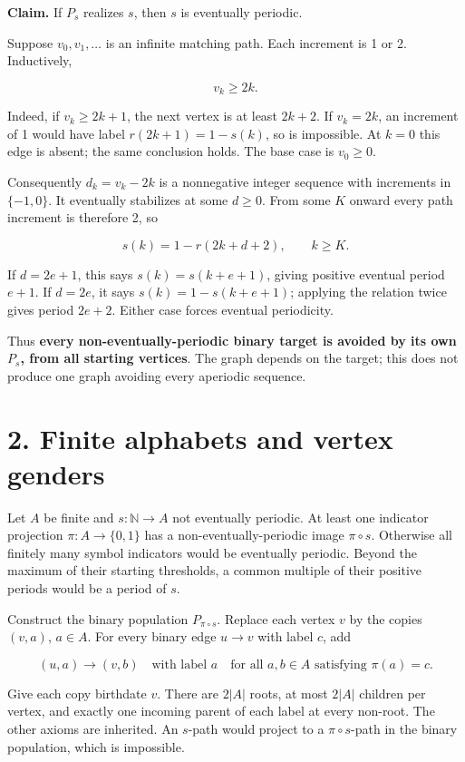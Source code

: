 \documentclass[
  11pt,
]{article}
\begin{document}
\textbf{Claim.} If \(P_s\) realizes \(s\), then \(s\) is eventually
periodic.

Suppose \(v_0,v_1,\ldots\) is an infinite matching path. Each increment
is 1 or 2. Inductively,

\[v_k\ge 2k.\]

Indeed, if \(v_k\ge2k+1\), the next vertex is at least \(2k+2\). If
\(v_k=2k\), an increment of 1 would have label \(r(2k+1)=1-s(k)\), so is
impossible. At \(k=0\) this edge is absent; the same conclusion holds.
The base case is \(v_0\ge0\).

Consequently \(d_k=v_k-2k\) is a nonnegative integer sequence with
increments in \(\{-1,0\}\). It eventually stabilizes at some \(d\ge0\).
From some \(K\) onward every path increment is therefore 2, so

\[s(k)=1-r(2k+d+2),\qquad k\ge K.\]

If \(d=2e+1\), this says \(s(k)=s(k+e+1)\), giving positive eventual
period \(e+1\). If \(d=2e\), it says \(s(k)=1-s(k+e+1)\); applying the
relation twice gives period \(2e+2\). Either case forces eventual
periodicity.

Thus \textbf{every non-eventually-periodic binary target is avoided by
its own \(P_s\), from all starting vertices}. The graph depends on the
target; this does not produce one graph avoiding every aperiodic
sequence.

\section{2. Finite alphabets and vertex
genders}\label{finite-alphabets-and-vertex-genders}

Let \(A\) be finite and \(s:\mathbb N\to A\) not eventually periodic. At
least one indicator projection \(\pi:A\to\{0,1\}\) has a
non-eventually-periodic image \(\pi\circ s\). Otherwise all finitely
many symbol indicators would be eventually periodic. Beyond the maximum
of their starting thresholds, a common multiple of their positive
periods would be a period of \(s\).

Construct the binary population \(P_{\pi\circ s}\). Replace each vertex
\(v\) by the copies \((v,a)\), \(a\in A\). For every binary edge
\(u\to v\) with label \(c\), add

\[ (u,a)\longrightarrow(v,b)\quad\text{with label }a
   \quad\text{for all }a,b\in A\text{ satisfying }\pi(a)=c.\]

Give each copy birthdate \(v\). There are \(2|A|\) roots, at most
\(2|A|\) children per vertex, and exactly one incoming parent of each
label at every non-root. The other axioms are inherited. An \(s\)-path
would project to a \(\pi\circ s\)-path in the binary population, which
is impossible.
\end{document}
